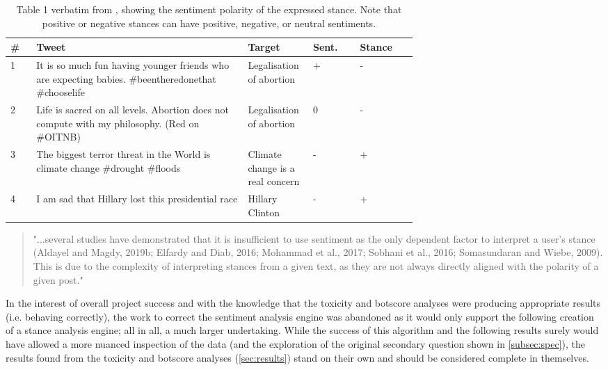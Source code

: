 \documentclass[a4paper,11pt]{article}  %
\begin{document}
	\begin{table}[htb!]
		\caption{Table 1 verbatim from \citeauthor{aldayelStanceDetectionSocial2021}, showing the sentiment polarity of the expressed stance. Note that positive or negative stances can have positive, negative, or neutral sentiments.}
		\label{tab:3}
		\begin{center}
			\begin{tabular}{||l p{0.52\linewidth} p{0.16\linewidth} l l||} 
				\hline
				\# & Tweet & Target & Sent. & Stance \\ [0.5ex] 
				\hline\hline
				1 & \raggedright{It is so much fun having younger friends who are expecting babies.} \#beentheredonethat \#chooselife & Legalisation of abortion & + & - \\ 
				\hline
				2 & \raggedright{Life is sacred on all levels. Abortion does not compute with my philosophy.} (Red on \#OITNB) & Legalisation of abortion & 0 & - \\ 
				\hline
				3 & \raggedright{The biggest terror threat in the World is climate change \#drought \#floods} & Climate change is a real concern & - & + \\ 
				\hline
				4 & \raggedright{I am sad that Hillary lost this presidential race} & Hillary Clinton & - & + \\ 
				\hline
			\end{tabular}
			\vspace{0.2cm}
			\begin{quote}
				"...several studies have demonstrated that it is insufficient to use sentiment as the only dependent factor to interpret a user’s stance (Aldayel and Magdy, 2019b; Elfardy and Diab, 2016; Mohammad et al., 2017; Sobhani et al., 2016; Somasundaran and Wiebe, 2009). This is due to the complexity of interpreting stances from a given text, as they are not always directly aligned with the polarity of a given post."
			\end{quote}
		\end{center}

	\end{table}
	
	In the interest of overall project success and with the knowledge that the toxicity and botscore analyses were producing appropriate results (i.e. behaving correctly), the work to correct the sentiment analysis engine was abandoned as it would only support the following creation of a stance analysis engine; all in all, a much larger undertaking. While the success of this algorithm and the following results surely would have allowed a more nuanced inspection of the data (and the exploration of the original secondary question shown in \autoref{subsec:spec}), the results found from the toxicity and botscore analyses (\autoref{sec:results}) stand on their own and should be considered complete in themselves.
	
\end{document}
